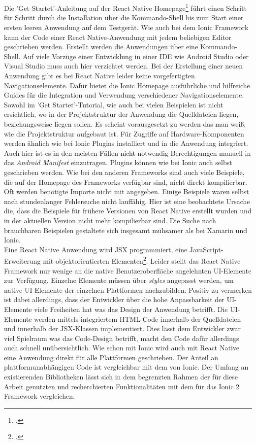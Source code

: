 \\
\\
Die 'Get Startet'-Anleitung auf der React Native Homepage\footcite{ReactNativeHomepage} führt einen Schritt für Schritt durch die Installation über die Kommando-Shell bis zum Start einer ersten leeren Anwendung auf dem Testgerät. Wie auch bei dem Ionic Framework kann der Code einer React Native-Anwendung mit jedem beliebigen Editor geschrieben werden. Erstellt werden die Anwendungen über eine Kommando-Shell. Auf viele Vorzüge einer Entwicklung in einer IDE wie Android Studio oder Visual Studio muss auch hier verzichtet werden. Bei der Erstellung einer neuen Anwendung gibt es bei React Native leider keine vorgefertigten Navigationselemente. Dafür bietet die Ionic Homepage ausführliche und hilfreiche Guides für die Integration und Verwendung verschiedener Navigationselemente. Sowohl im 'Get Startet'-Tutorial, wie auch bei vielen Beispielen ist nicht ersichtlich, wo in der Projektstruktur der Anwendung die Quelldateien liegen, beziehungsweise liegen sollen. Es scheint vorausgesetzt zu werden das man weiß, wie die Projektstruktur aufgebaut ist. Für Zugriffe auf Hardware-Komponenten werden ähnlich wie bei Ionic Plugins installiert und in die Anwendung integriert. Auch hier ist es in den meisten Fällen nicht notwendig Berechtigungen manuell in das \textit{Android Manifest} einzutragen. Plugins können wie bei Ionic auch selbst geschrieben werden. Wie bei den anderen Frameworks sind auch viele Beispiele, die auf der Homepage des Frameworks verfügbar sind, nicht direkt kompilierbar. Oft werden benötigte Importe nicht mit angegeben. Einige Beispiele waren selbst nach stundenlanger Fehlersuche nicht lauffähig. Hier ist eine beobachtete Ursache die, dass die Beispiele für frühere Versionen von React Native erstellt wurden und in der aktuellen Version nicht mehr kompilierbar sind. Die Suche nach brauchbaren Beispielen gestaltete sich insgesamt mühsamer als bei Xamarin und Ionic.
\\
Eine React Native Anwendung wird JSX programmiert, eine JavaScript-Erweiterung mit objektorientierten Elementen\footcite{JSX}. Leider stellt das React Native Framework nur wenige an die native Benutzeroberfläche angelehnten UI-Elemente zur Verfügung. Einzelne Elemente müssen über \textit{styles} angepasst werden, um native UI-Elemente der einzelnen Plattformen nachzubilden. Positiv zu vermerken ist dabei allerdings, dass der Entwickler über die hohe Anpassbarkeit der UI-Elemente viele Freiheiten hat was das Design der Anwendung betrifft. Die UI-Elemente werden mittels integriertem HTML-Code innerhalb der Quelldateien und innerhalb der JSX-Klassen implementiert. Dies lässt dem Entwickler zwar viel Spielraum was das Code-Design betrifft, macht den Code dafür allerdings auch schnell unübersichtlich. Wie schon mit Ionic wird auch mit React Native eine Anwendung direkt für alle Plattformen geschrieben. Der Anteil an plattformunabhängigen Code ist vergleichbar mit dem von Ionic. Der Umfang an existierenden Bibliotheken lässt sich in dem begrenzten Rahmen der für diese Arbeit genutzten und recherchierten Funktionalitäten mit dem für das Ionic 2 Framework vergleichen.


